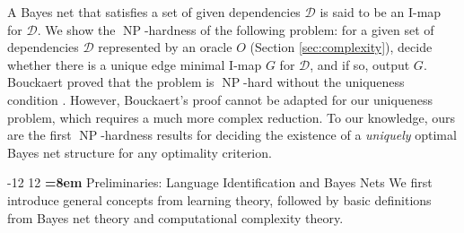 \documentclass{elsarticle}%
\makeatletter
\renewcommand\section{\@startsection {section}{1}{\z@}%
  {-12\p@ \@plus -4\p@ \@minus -4\p@}%
                       {12\p@ \@plus 4\p@ \@minus 4\p@}%
                                   {\normalfont\large\bfseries\boldmath
                                   \rightskip=\z@ \@plus 8em\pretolerance=10000 }}
\DeclareMathOperator{\NP}{\mathbf{\mathrm{NP}}}
\newcommand{\D}{\mathcal{D}}
\makeatother
\begin{document}
A Bayes net that satisfies a set of given dependencies $\D$ is said to be an I-map for $\D$.
We show the $\NP$-hardness of the following problem: for a given set of dependencies $\D$ represented by an oracle $O$ (Section \ref{sec:complexity}), decide whether there is a unique edge minimal I-map $G$ for $\D$, and if so, output $G$. Bouckaert proved that the problem is $\NP$-hard without the uniqueness condition
\cite[Lemma 4.5]{bouckaert95:_bayes}.
However, Bouckaert's proof cannot be adapted
for our uniqueness problem, which requires a much more complex reduction.
To our knowledge, ours are the first $\NP$-hardness results for deciding
the existence of a {\em uniquely} optimal Bayes net structure for any optimality criterion.

\section{Preliminaries: Language Identification and Bayes Nets
\label{sec:define}}
We first introduce general concepts from learning theory, followed by basic definitions from Bayes net theory and computational complexity theory.
\end{document}

